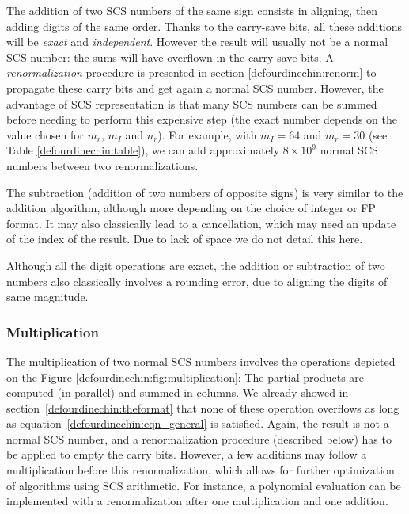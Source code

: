 The addition of two SCS numbers of the same sign consists in
aligning, then adding digits of the same order. Thanks to the
carry-save bits, all these additions will be \emph{exact} and
\emph{independent}.  However the result will usually not be a normal
SCS number: the sums will have overflown in the carry-save bits. A
\emph{renormalization} procedure is presented in section \ref{defourdinechin:renorm}
to propagate these carry bits and get again a normal SCS number.
However, the advantage of SCS representation is that many SCS
numbers can be summed before needing to perform this expensive step
(the exact number depends on the value chosen for $m_r$, $m_I$ and
$n_r$). For example, with $m_I=64$ and $m_r=30$ (see
Table \ref{defourdinechin:table}), we can add approximately $8 \times 10^{9}$
normal SCS numbers between two renormalizations. 

The subtraction (addition of two numbers of opposite signs) is very
similar to the addition algorithm, although more depending on the
choice of integer or FP format. It may also classically lead to a
cancellation, which may need an update of the index of the result. Due
to lack of space we do not detail this here.

Although all the digit operations are exact, the addition or
subtraction of two numbers also classically involves a rounding error,
due to aligning the digits of same magnitude.




\subsubsection{Multiplication}

The multiplication of two normal SCS numbers involves the operations
depicted on the Figure \ref{defourdinechin:fig:multiplication}: The partial products
are computed (in parallel) and summed in columns. We already showed in
section~\ref{defourdinechin:theformat} that none of these operation overflows as long
as equation~\ref{defourdinechin:eqn_general} is satisfied. Again, the result is not a
normal SCS number, and a renormalization procedure (described below)
has to be applied to empty the carry bits. However, a few additions
may follow a multiplication before this renormalization, which allows
for further optimization of algorithms using SCS arithmetic. For
instance, a polynomial evaluation can be implemented with a
renormalization after one multiplication and one addition.

